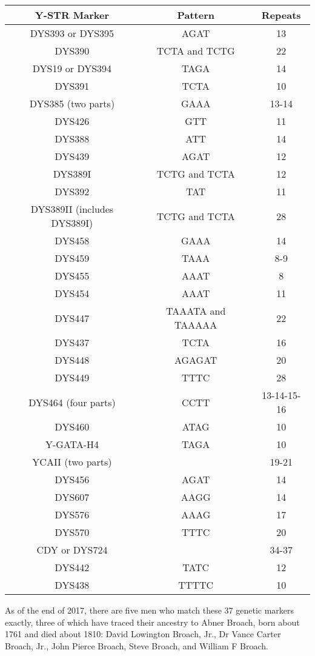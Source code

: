 \documentclass[11pt,letter]{book}
\begin{document}
\begin{center}
\begin{tabular}{c | c | c}
	Y-STR Marker & Pattern & Repeats \\
	\hline
	DYS393 or DYS395 & AGAT & 13 \\
	DYS390 & TCTA and TCTG & 22 \\
	DYS19 or DYS394 & TAGA & 14 \\
	DYS391 & TCTA & 10 \\
	DYS385 (two parts) & GAAA & 13-14 \\
	DYS426 & GTT & 11 \\
	DYS388 & ATT & 14 \\
	DYS439 & AGAT & 12 \\
	DYS389I & TCTG and TCTA & 12 \\
	DYS392 & TAT & 11 \\
	DYS389II (includes DYS389I) & TCTG and TCTA & 28 \\
	DYS458 & GAAA & 14 \\
	DYS459 & TAAA & 8-9 \\
	DYS455 & AAAT & 8 \\
	DYS454 & AAAT & 11 \\
	DYS447 & TAAATA and TAAAAA & 22 \\
	DYS437 & TCTA & 16 \\
	DYS448 & AGAGAT & 20 \\
	DYS449 & TTTC & 28 \\
	DYS464 (four parts) & CCTT & 13-14-15-16 \\
	DYS460 & ATAG & 10 \\
	Y-GATA-H4 & TAGA & 10 \\
	YCAII (two parts) & & 19-21 \\
	DYS456 & AGAT & 14 \\
	DYS607 & AAGG & 14 \\
	DYS576 & AAAG & 17 \\
	DYS570 & TTTC & 20 \\
	CDY or DYS724 & & 34-37 \\
	DYS442 & TATC & 12 \\
	DYS438 & TTTTC & 10 \\
\end{tabular}
\end{center}

As of the end of 2017, there are five men who match these 37 genetic markers exactly, three of which have traced their ancestry to Abner Broach, born about 1761 and died about 1810:  David Lowington Broach, Jr., Dr Vance Carter Broach, Jr., John Pierce Broach, Steve Broach, and William F Broach.
\end{document}
